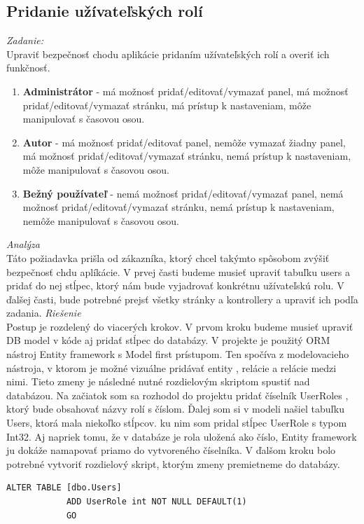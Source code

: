 \documentclass[11pt, oneside]{report}
\begin{document}
\subsection{Pridanie užívateľských rolí}
\textit{Zadanie:}\\
Upraviť bezpečnosť chodu aplikácie pridaním užívateľských rolí a overiť ich funkčnosť.
\begin{enumerate}
\item \textbf{Administrátor} - má možnosť pridať/editovať/vymazať panel, má možnosť pridať/editovať/vymazať stránku, má prístup k nastaveniam, môže manipulovať s časovou osou.
\item \textbf{Autor} - má možnosť pridať/editovať panel, nemôže vymazať žiadny panel, má možnosť pridať/editovať/vymazať stránku, nemá prístup k nastaveniam, môže manipulovať s časovou osou.
\item \textbf{Bežný používateľ} - nemá možnosť pridať/editovať/vymazať panel, nemá možnosť pridať/editovať/vymazať stránku, nemá prístup k nastaveniam, nemôže manipulovať s časovou osou.
\end{enumerate}
\textit{Analýza}\\
Táto požiadavka prišla od zákazníka, ktorý chcel takýmto spôsobom zvýšiť bezpečnosť chdu aplíkácie.
V prvej časti budeme musieť upraviť tabuľku \textsf{users} a pridať do nej stĺpec, ktorý nám bude vyjadrovať konkrétnu užívateľskú rolu. V ďalšej časti, bude potrebné prejsť všetky stránky a kontrollery a upraviť ich podľa zadania. 
\textit{Riešenie}\\
Postup je rozdelený do viacerých krokov. V prvom kroku budeme musieť upraviť DB model v kóde aj  pridať stĺpec do databázy. V projekte je použitý ORM nástroj Entity framework s Model first prístupom. Ten spočíva z modelovacieho nástroja, v ktorom je možné vizuálne pridávať entity , relácie a relácie medzi nimi. Tieto zmeny je následné nutné rozdielovým skriptom spustiť nad databázou. Na začiatok som sa rozhodol do projektu pridať číselník \textsf{UserRoles} , ktorý bude obsahovať  názvy rolí s číslom. Ďalej som si v modeli našiel tabuľku Users, ktorá mala niekoľko stĺpcov.  ku nim som pridal stĺpec \textsf{UserRole} s typom \textsf{Int32}. Aj napriek tomu, že v databáze je rola uložená ako číslo, Entity framework ju dokáže namapovať priamo do vytvoreného číselníka. V ďalšom kroku bolo potrebné vytvoriť rozdielový skript, ktorým zmeny premietneme do databázy.
\lstset{language=sql}
\begin{lstlisting}[caption=SQL skript pre pridanie užívateľelskej role,captionpos=b]
			ALTER TABLE [dbo.Users]
			ADD UserRole int NOT NULL DEFAULT(1)
			GO
\end{lstlisting}
\end{document}
